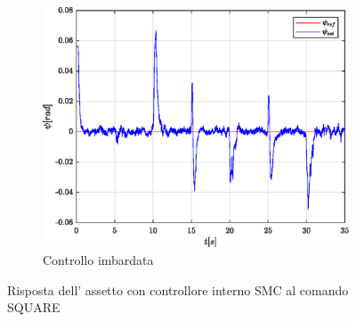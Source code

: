\begin{figure}
\begin{subfigure}{0.45\textwidth}
		\centering
		\includegraphics[width=1\textwidth]{Simulazioni/Figure/SMC/SQUARE/AttitudeControlYaw}
		\caption{Controllo imbardata}
	\end{subfigure}
	\caption{Risposta dell' assetto con controllore interno SMC al comando SQUARE}
\end{figure}


